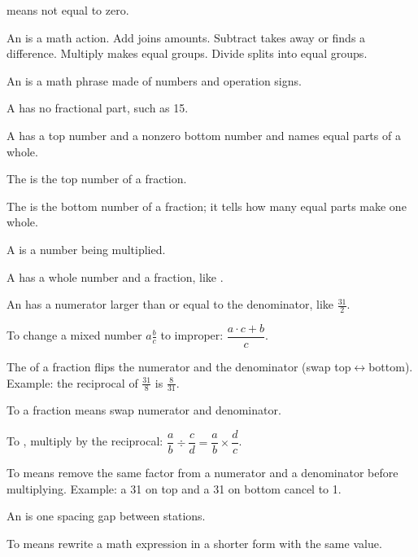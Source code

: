 \begin{words}
  \item {}means not equal to zero.
  \item An is a math action. Add joins amounts. Subtract takes away or finds a difference. Multiply makes equal groups. Divide splits into equal groups.
  \item An is a math phrase made of numbers and operation signs.
  \item A has no fractional part, such as 15.
  \item A has a top number and a nonzero bottom number and names equal parts of a whole.
  \item The is the top number of a fraction.
  \item The is the bottom number of a fraction; it tells how many equal parts make one whole.
  \item A is a number being multiplied.
  \item A has a whole number and a fraction, like .
  \item An has a numerator larger than or equal to the denominator, like $\frac{31}{2}$.
  \item To change a mixed number $a\frac{b}{c}$ to improper: $\dfrac{a \cdot c + b}{c}$.
  \item The of a fraction flips the numerator and the denominator (swap top$\leftrightarrow$bottom). Example: the reciprocal of $\frac{31}{8}$ is $\frac{8}{31}$.
  \item To a fraction means swap numerator and denominator.
  \item To , multiply by the reciprocal: $\dfrac{a}{b} \div \dfrac{c}{d} = \dfrac{a}{b} \times \dfrac{d}{c}$.
  \item To means remove the same factor from a numerator and a denominator before multiplying. Example: a 31 on top and a 31 on bottom cancel to 1.
  \item An is one spacing gap between stations.
  \item To means rewrite a math expression in a shorter form with the same value.
\end{words}

